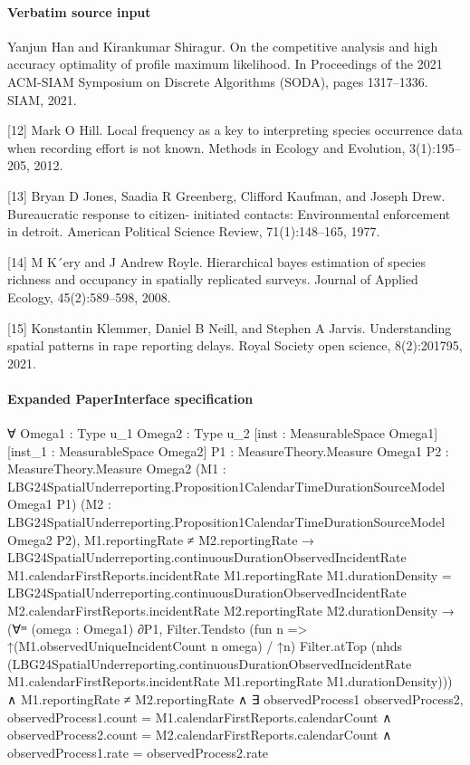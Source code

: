 \documentclass[10pt]{article}
\begin{document}
\paragraph{Verbatim source input}
\begin{ReviewVerbatim}
[11] Yanjun Han and Kirankumar Shiragur. On the competitive analysis and high accuracy optimality of profile
maximum likelihood.
In Proceedings of the 2021 ACM-SIAM Symposium on Discrete Algorithms (SODA),
pages 1317–1336. SIAM, 2021.

[12] Mark O Hill. Local frequency as a key to interpreting species occurrence data when recording effort is not
known. Methods in Ecology and Evolution, 3(1):195–205, 2012.

[13] Bryan D Jones, Saadia R Greenberg, Clifford Kaufman, and Joseph Drew. Bureaucratic response to citizen-
initiated contacts: Environmental enforcement in detroit. American Political Science Review, 71(1):148–165,
1977.

[14] M K´ery and J Andrew Royle.
Hierarchical bayes estimation of species richness and occupancy in spatially
replicated surveys. Journal of Applied Ecology, 45(2):589–598, 2008.

[15] Konstantin Klemmer, Daniel B Neill, and Stephen A Jarvis. Understanding spatial patterns in rape reporting
delays. Royal Society open science, 8(2):201795, 2021.
\end{ReviewVerbatim}


\paragraph{Expanded PaperInterface specification}
\begin{ReviewVerbatim}
∀ {Omega1 : Type u_1} {Omega2 : Type u_2} [inst : MeasurableSpace Omega1] [inst_1 : MeasurableSpace Omega2]
  {P1 : MeasureTheory.Measure Omega1} {P2 : MeasureTheory.Measure Omega2}
  (M1 : LBG24SpatialUnderreporting.Proposition1CalendarTimeDurationSourceModel Omega1 P1)
  (M2 : LBG24SpatialUnderreporting.Proposition1CalendarTimeDurationSourceModel Omega2 P2),
  M1.reportingRate ≠ M2.reportingRate →
    LBG24SpatialUnderreporting.continuousDurationObservedIncidentRate M1.calendarFirstReports.incidentRate
          M1.reportingRate M1.durationDensity =
        LBG24SpatialUnderreporting.continuousDurationObservedIncidentRate M2.calendarFirstReports.incidentRate
          M2.reportingRate M2.durationDensity →
      (∀ᵐ (omega : Omega1) ∂P1,
          Filter.Tendsto (fun n => ↑(M1.observedUniqueIncidentCount n omega) / ↑n) Filter.atTop
            (nhds
              (LBG24SpatialUnderreporting.continuousDurationObservedIncidentRate M1.calendarFirstReports.incidentRate
                M1.reportingRate M1.durationDensity))) ∧
        M1.reportingRate ≠ M2.reportingRate ∧
          ∃ observedProcess1 observedProcess2,
            observedProcess1.count = M1.calendarFirstReports.calendarCount ∧
              observedProcess2.count = M2.calendarFirstReports.calendarCount ∧
                observedProcess1.rate = observedProcess2.rate
\end{ReviewVerbatim}
\end{document}
